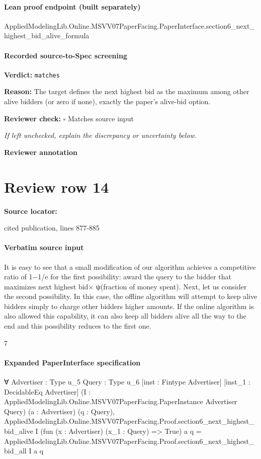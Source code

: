 \documentclass[10pt]{article}
\newcommand{\reviewerbox}{%
  \par\noindent\fbox{\parbox{0.96\linewidth}{\rule{0pt}{0.38in}}}\par
}
\newcommand{\reviewmatch}[1]{%
  \par\noindent\textbf{Reviewer check:} $\square$\; #1\par
  \noindent\emph{If left unchecked, explain the discrepancy or uncertainty below.}\par
}
\begin{document}
\paragraph{Lean proof endpoint (built separately)}\begin{ReviewVerbatim}
AppliedModelingLib.Online.MSVV07PaperFacing.PaperInterface.section6_next_highest_bid_alive_formula
\end{ReviewVerbatim}

\paragraph{Recorded source-to-Spec screening}
\textbf{Verdict:} \texttt{matches}
\\
{\raggedright
\textbf{Reason:} The target defines the next highest bid as the maximum among other alive bidders (or zero if none), exactly the paper's alive-\allowbreak{}bid option.\allowbreak{}
\par}
\reviewmatch{Matches source input}
\noindent\textbf{Reviewer annotation}\par
\reviewerbox
\clearpage
\hypertarget{source-claim-a231e898ec861552}{}
\section*{Review row 14}
\textbf{Source locator:} {\footnotesize\raggedright cited publication, lines 877-\allowbreak{}885\par}
\paragraph{Verbatim source input}
\begin{ReviewVerbatim}
It is easy to see that a small modification of our algorithm achieves a competitive ratio of
1−1/e for the first possibility: award the query to the bidder that maximizes next highest bid×
ψ(fraction of money spent). Next, let us consider the second possibility. In this case, the offline
algorithm will attempt to keep alive bidders simply to charge other bidders higher amounts.
If the online algorithm is also allowed this capability, it can also keep all bidders alive all the
way to the end and this possibility reduces to the first one.

7
\end{ReviewVerbatim}



\paragraph{Expanded PaperInterface specification}
\begin{ReviewVerbatim}
∀ {Advertiser : Type u_5} {Query : Type u_6} [inst : Fintype Advertiser] [inst_1 : DecidableEq Advertiser]
  (I : AppliedModelingLib.Online.MSVV07PaperFacing.PaperInstance Advertiser Query) (a : Advertiser) (q : Query),
  AppliedModelingLib.Online.MSVV07PaperFacing.Proof.section6_next_highest_bid_alive I
      (fun (x : Advertiser) (x_1 : Query) => True) a q =
    AppliedModelingLib.Online.MSVV07PaperFacing.Proof.section6_next_highest_bid_all I a q
\end{ReviewVerbatim}
\end{document}
